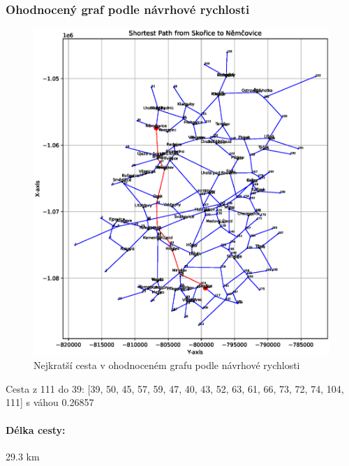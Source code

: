 \subsubsection*{Ohodnocený graf podle návrhové rychlosti}
\begin{figure}[H]
    \centering
    \includegraphics[width=\textwidth]{images/Figure_1_speed.eps}
    \caption{Nejkratší cesta v ohodnoceném grafu podle návrhové rychlosti}
\end{figure}
Cesta z 111 do 39: [39, 50, 45, 57, 59, 47, 40, 43, 52, 63, 61, 66, 73, 72, 74, 104, 111] s váhou 0.26857
\paragraph{Délka cesty:} 29.3 km

